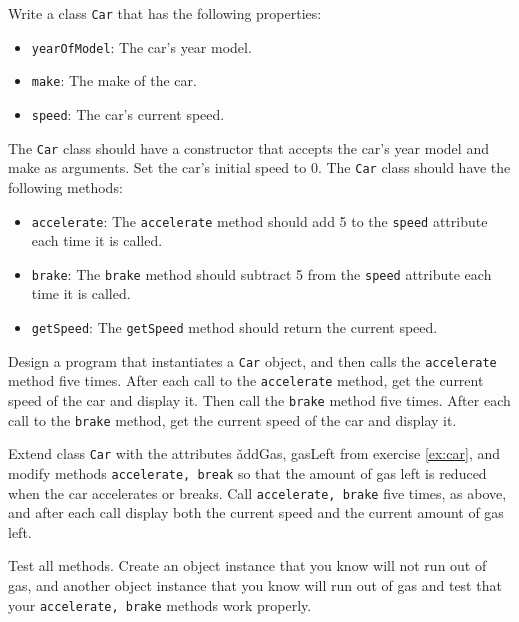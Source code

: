 Write a class \lstinline{Car} that has the following properties:
  \begin{itemize}
  \item \lstinline{yearOfModel}: The car's year model.
  \item \lstinline{make}: The make of the car.
  \item \lstinline{speed}: The car's current speed.
  \end{itemize}
  The \lstinline{Car} class should have a constructor that accepts the car's year model and make as arguments. Set the car's initial speed to 0.  The \lstinline{Car} class should have the following methods:
  \begin{itemize}
  \item \lstinline{accelerate}: The \lstinline{accelerate} method should add 5 to the \lstinline{speed} attribute each time it is called.
  \item \lstinline{brake}: The \lstinline{brake} method should subtract 5 from the \lstinline{speed} attribute each time it is called.
  \item \lstinline{getSpeed}: The \lstinline{getSpeed} method should return the current speed.
  \end{itemize}
  Design a program that instantiates a \lstinline{Car} object, and then calls the \lstinline{accelerate} method five times. After each call to the \lstinline{accelerate} method, get the current speed of the car and display it. Then call the \lstinline{brake} method five times. After each call to the \lstinline{brake} method, get the current speed of the car and display it.
  
  Extend class \lstinline{Car} with the attributes \v{addGas, gasLeft} from exercise \ref{ex:car}, and modify methods \lstinline{accelerate, break} so that the amount of gas left is reduced when the car accelerates or breaks. Call \lstinline{accelerate, brake} five times, as above, and after each call display both the current speed and the current amount of gas left.
  
  Test all methods. Create an object instance that you know will not run out of gas, and another object instance that you know will run out of gas and test that your \lstinline{accelerate, brake} methods work properly.
  